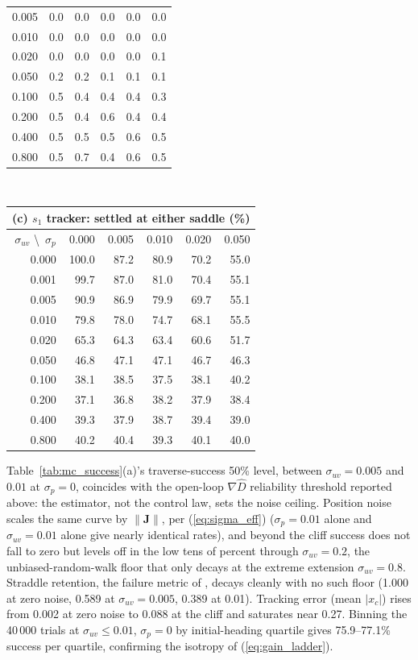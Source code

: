 \documentclass[lettersize,journal]{IEEEtran}
\begin{document}
\begin{table}[!t]
\begin{tabular}{r|rrrrr}
0.005 &   0.0 &  0.0 &  0.0 &  0.0 &  0.0 \\
0.010 &   0.0 &  0.0 &  0.0 &  0.0 &  0.0 \\
0.020 &   0.0 &  0.0 &  0.0 &  0.0 &  0.1 \\
0.050 &   0.2 &  0.2 &  0.1 &  0.1 &  0.1 \\
0.100 &   0.5 &  0.4 &  0.4 &  0.4 &  0.3 \\
0.200 &   0.5 &  0.4 &  0.6 &  0.4 &  0.4 \\
0.400 &   0.5 &  0.5 &  0.5 &  0.6 &  0.5 \\
0.800 &   0.5 &  0.7 &  0.4 &  0.6 &  0.5 \\
\hline
\end{tabular}
\\[4pt]
\begin{tabular}{r|rrrrr}
\multicolumn{6}{l}{(c) $s_1$ tracker: settled at either saddle (\%)} \\
\hline
$\sigma_{uv}$ \textbackslash\ $\sigma_p$ & 0.000 & 0.005 & 0.010 & 0.020 & 0.050 \\
\hline
0.000 & 100.0 & 87.2 & 80.9 & 70.2 & 55.0 \\
0.001 &  99.7 & 87.0 & 81.0 & 70.4 & 55.1 \\
0.005 &  90.9 & 86.9 & 79.9 & 69.7 & 55.1 \\
0.010 &  79.8 & 78.0 & 74.7 & 68.1 & 55.5 \\
0.020 &  65.3 & 64.3 & 63.4 & 60.6 & 51.7 \\
0.050 &  46.8 & 47.1 & 47.1 & 46.7 & 46.3 \\
0.100 &  38.1 & 38.5 & 37.5 & 38.1 & 40.2 \\
0.200 &  37.1 & 36.8 & 38.2 & 37.9 & 38.4 \\
0.400 &  39.3 & 37.9 & 38.7 & 39.4 & 39.0 \\
0.800 &  40.2 & 40.4 & 39.3 & 40.1 & 40.0 \\
\hline
\end{tabular}
\end{table}

Table~\ref{tab:mc_success}(a)'s traverse-success 50\% level, between
$\sigma_{uv} = 0.005$ and $0.01$ at $\sigma_p = 0$, coincides with the
open-loop $\nabla\hat{D}$ reliability threshold reported above: the
estimator, not the control law, sets the noise ceiling. Position noise
scales the same curve by $\|\mathbf{J}\|$, per (\ref{eq:sigma_eff})
($\sigma_p = 0.01$ alone and
$\sigma_{uv} = 0.01$ alone give nearly identical rates), and beyond the
cliff success does not fall to zero but levels off in the low tens of
percent through $\sigma_{uv} = 0.2$, the unbiased-random-walk floor
that only decays at the extreme extension $\sigma_{uv} = 0.8$.
Straddle retention, the failure metric of \cite{9}, decays cleanly with
no such floor (1.000 at zero noise, 0.589 at $\sigma_{uv} = 0.005$,
0.389 at 0.01). Tracking error (mean $|x_c|$) rises from 0.002 at
zero noise to 0.088 at the cliff and saturates near 0.27. Binning
the 40\,000 trials at $\sigma_{uv} \leq 0.01$, $\sigma_p = 0$ by
initial-heading quartile gives 75.9--77.1\% success per quartile,
confirming the isotropy of (\ref{eq:gain_ladder}).
\end{document}
